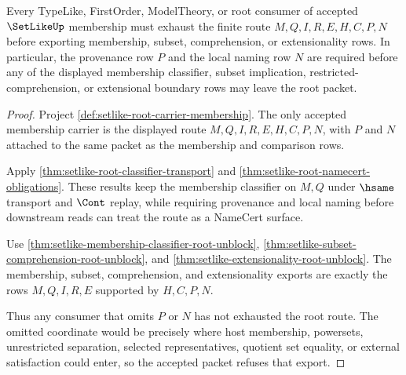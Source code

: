 \begin{theorem}\label{thm:setlike-root-membership-provenance-exhaustion}
Every TypeLike, FirstOrder, ModelTheory, or root consumer of accepted $\SetLikeUp$ membership must exhaust the finite route $M,Q,I,R,E,H,C,P,N$ before exporting membership, subset, comprehension, or extensionality rows. In particular, the provenance row $P$ and the local naming row $N$ are required before any of the displayed membership classifier, subset implication, restricted-comprehension, or extensional boundary rows may leave the root packet.
\end{theorem}
\begin{proof}
Project \autoref{def:setlike-root-carrier-membership}. The only accepted membership carrier is the displayed route $M,Q,I,R,E,H,C,P,N$, with $P$ and $N$ attached to the same packet as the membership and comparison rows.

Apply \autoref{thm:setlike-root-classifier-transport} and \autoref{thm:setlike-root-namecert-obligations}. These results keep the membership classifier on $M,Q$ under $\hsame$ transport and $\Cont$ replay, while requiring provenance and local naming before downstream reads can treat the route as a NameCert surface.

Use \autoref{thm:setlike-membership-classifier-root-unblock}, \autoref{thm:setlike-subset-comprehension-root-unblock}, and \autoref{thm:setlike-extensionality-root-unblock}. The membership, subset, comprehension, and extensionality exports are exactly the rows $M,Q,I,R,E$ supported by $H,C,P,N$.

Thus any consumer that omits $P$ or $N$ has not exhausted the root route. The omitted coordinate would be precisely where host membership, powersets, unrestricted separation, selected representatives, quotient set equality, or external satisfaction could enter, so the accepted packet refuses that export.
\end{proof}

